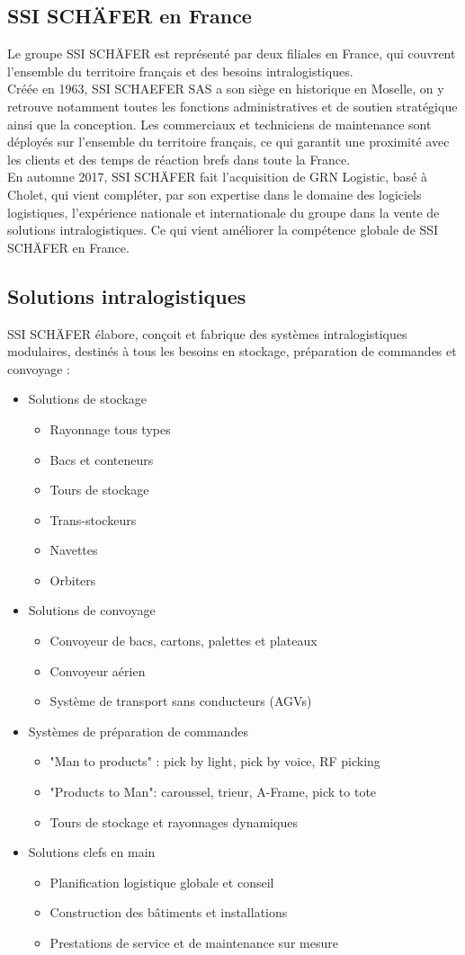 \documentclass[a4paper, 12pt, french]{article}
\newcommand{\bdot}{\item[\color{ssiYellow}\ding{108}]}
\newcommand{\bdotoutlined}{\item[\color{ssiYellow}\ding{109}]}
\begin{document}
			\newpage

			\subsection{SSI SCHÄFER en France}
				Le groupe SSI SCHÄFER est représenté par deux filiales en France, qui couvrent l'ensemble du territoire français et des besoins intralogistiques.\\

				Créée en 1963, SSI SCHAEFER SAS a son siège en historique en Moselle, on y retrouve notamment toutes les fonctions administratives et de soutien stratégique ainsi que la conception. Les commerciaux et techniciens de maintenance sont déployés sur l'ensemble du territoire français, ce qui garantit une proximité avec les clients et des temps de réaction brefs dans toute la France.\\

				En automne 2017, SSI SCHÄFER fait l'acquisition de GRN Logistic, basé à Cholet, qui vient compléter, par son expertise dans le domaine des logiciels logistiques, l'expérience nationale et internationale du groupe dans la vente de solutions intralogistiques. Ce qui vient améliorer la compétence globale de SSI SCHÄFER en France.
			
			\subsection{Solutions intralogistiques}
				SSI SCHÄFER élabore, conçoit et fabrique des systèmes intralogistiques modulaires, destinés à tous les besoins en stockage, préparation de commandes et convoyage :
				\begin{itemize}
					\bdot{Solutions de stockage}
						\begin{itemize}
							\bdotoutlined{Rayonnage tous types}
							\bdotoutlined{Bacs et conteneurs}
							\bdotoutlined{Tours de stockage}
							\bdotoutlined{Trans-stockeurs}
							\bdotoutlined{Navettes}
							\bdotoutlined{Orbiters}
						\end{itemize}
					\bdot{Solutions de convoyage}
						\begin{itemize}
							\bdotoutlined{Convoyeur de bacs, cartons, palettes et plateaux}
							\bdotoutlined{Convoyeur aérien}
							\bdotoutlined{Système de transport sans conducteurs (AGVs)}
						\end{itemize}
					\bdot{Systèmes de préparation de commandes}
						\begin{itemize}
							\bdotoutlined{"Man to products" : pick by light, pick by voice, RF picking}
							\bdotoutlined{"Products to Man": caroussel, trieur, A-Frame, pick to tote}
							\bdotoutlined{Tours de stockage et rayonnages dynamiques}
						\end{itemize}
					\bdot{Solutions clefs en main}
						\begin{itemize}
							\bdotoutlined{Planification logistique globale et conseil}
							\bdotoutlined{Construction des bâtiments et installations}
							\bdotoutlined{Prestations de service et de maintenance sur mesure}
						\end{itemize}
				\end{itemize}
\end{document}
